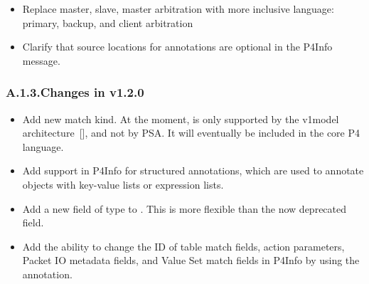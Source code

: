 \documentclass[11pt]{article}
\begin{document}
{\begin{itemize}[noitemsep,topsep=\mdcompacttopsep]
\item{}Replace master, slave, master arbitration with more inclusive language:
primary, backup, and client arbitration%

\item{}Clarify that source locations for annotations are optional in the P4Info
message.%
\end{itemize}%

\subsubsection{A.1.3.\hspace*{0.5em}Changes in v1.2.0}\label{sec-changes-in-v120}%

\begin{itemize}[noitemsep,topsep=\mdcompacttopsep]%

\item{}Add new  match kind. At the moment,  is only supported by
the v1model architecture~[], and not by PSA. It will eventually be
included in the core P4 language.%

\item{}Add support in P4Info for structured annotations, which are used to annotate
objects with key-value lists or expression lists.%

\item{}Add a new  field of type  to . This is more
flexible than the now deprecated  field.%

\item{}Add the ability to change the ID of table match fields, action parameters,
Packet IO metadata fields, and Value Set match fields in P4Info by using the
 annotation.%


\end{itemize}}
\end{document}
